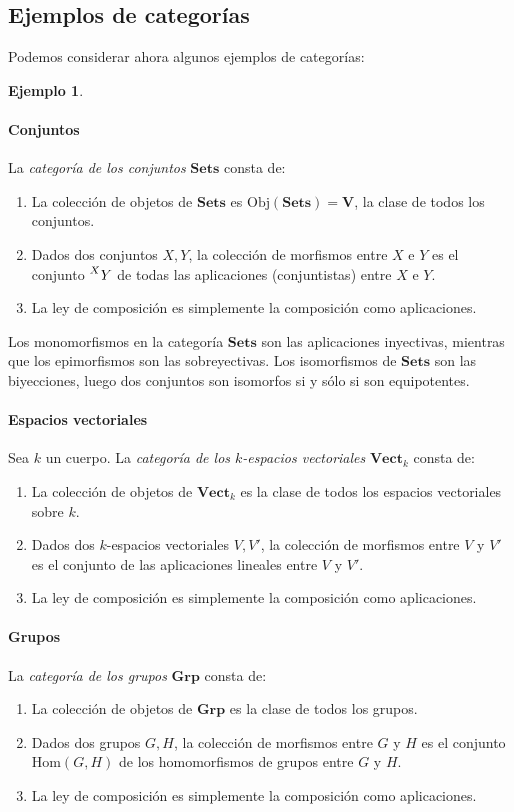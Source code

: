 \documentclass[12pt,a4paper]{book}
\theoremstyle{definition} \newtheorem{defn}[thm]{Definición}
\theoremstyle{definition} \newtheorem{ejemplo}[thm]{Ejemplo}
\theoremstyle{definition} \newtheorem{ejercicio}[thm]{Ejercicio}
\theoremstyle{remark} \newtheorem*{obs}{Observación}
\def\obj{\mathrm{Obj}}
\def\grp{\mathbf{Grp}}
\begin{document}
\subsection{Ejemplos de categorías}

Podemos considerar ahora algunos ejemplos de categorías:

\begin{ejemplo}\leavevmode

  \paragraph{Conjuntos} La \emph{categoría de los conjuntos} $\mathbf{Sets}$ consta de:
  \begin{enumerate}
    \item La colección de objetos de $\mathbf{Sets}$ es $\obj(\mathbf{Sets})=\mathbf{V}$, la clase de todos los conjuntos.
    \item Dados dos conjuntos $X, Y$, la colección de morfismos entre $X$ e $Y$ es el conjunto $\prescript{X}{}Y$ de todas las aplicaciones (conjuntistas) entre $X$ e $Y$.
    \item La ley de composición es simplemente la composición como aplicaciones.
  \end{enumerate}
  Los monomorfismos en la categoría $\mathbf{Sets}$ son las aplicaciones inyectivas, mientras que los epimorfismos son las sobreyectivas. Los isomorfismos de $\mathbf{Sets}$ son las biyecciones, luego dos conjuntos son isomorfos si y sólo si son equipotentes.

  \paragraph{Espacios vectoriales} Sea $k$ un cuerpo. La \emph{categoría de los $k$-espacios vectoriales} $\mathbf{Vect}_k$ consta de:
  \begin{enumerate}
    \item La colección de objetos de $\mathbf{Vect}_k$ es la clase de todos los espacios vectoriales sobre $k$.
    \item Dados dos $k$-espacios vectoriales $V, V'$, la colección de morfismos entre $V$ y $V'$ es el conjunto de las aplicaciones lineales entre $V$ y $V'$.
    \item La ley de composición es simplemente la composición como aplicaciones.
  \end{enumerate}

  \paragraph{Grupos} La \emph{categoría de los grupos} $\grp$ consta de:
  \begin{enumerate}
    \item La colección de objetos de $\grp$ es la clase de todos los grupos.
    \item Dados dos grupos $G, H$, la colección de morfismos entre $G$ y $H$ es el conjunto $\mathrm{Hom}(G,H)$ de los homomorfismos de grupos entre $G$ y $H$.
    \item La ley de composición es simplemente la composición como aplicaciones.
  \end{enumerate}


\end{ejemplo}
\end{document}
